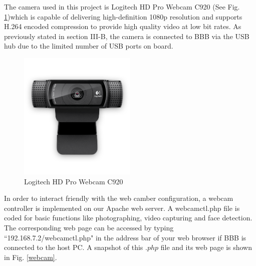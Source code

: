 \documentclass[12pt,journal,draftclsnofoot,onecolumn]{IEEEtran}
\begin{document}
The camera used in this project is Logitech HD Pro Webcam C920 \cite{logicam} (See Fig. \ref{logicam})which is  capable of delivering high-definition 1080p resolution and supports H.264 encoded compression to provide high quality video at low bit rates. As previously stated in section III-B, the camera is connected to BBB via the USB hub due to the limited number of USB ports on board.
\begin{figure}[htb]
	\centering
	\includegraphics[width=2.2in]{./figs/webcam4.PNG}
	\caption{Logitech HD Pro Webcam C920}
	\label{logicam}
\end{figure}

In order to interact friendly with the web camber configuration, a webcam controller is implemented on our Apache web server. A webcamctl.php file is coded for basic functions like photographing, video capturing and face detection. The corresponding web page can be accessed by typing ``192.168.7.2/webcamctl.php" in the address bar of your web browser if BBB is connected to the host PC.  A snapshot of this $.php$ file and its web page is shown in Fig. \ref{webcam}.
\end{document}
